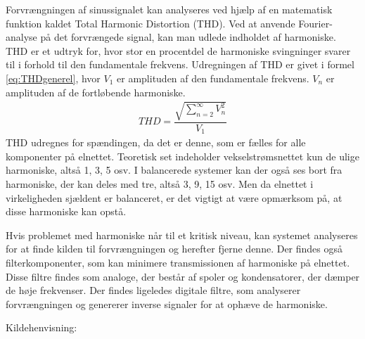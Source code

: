 Forvrængningen af sinussignalet kan analyseres ved hjælp af en matematisk funktion kaldet Total Harmonic Distortion (THD). Ved at anvende Fourier-analyse på det forvrængede signal, kan man udlede indholdet af harmoniske. THD er et udtryk for, hvor stor en procentdel de harmoniske svingninger svarer til i forhold til den fundamentale frekvens. Udregningen af THD er givet i formel \ref{eq:THDgenerel}, hvor $V_1$ er amplituden af den fundamentale frekvens. $V_n$ er amplituden af de fortløbende harmoniske. 
\begin{align}
THD = \dfrac{\sqrt{\sum_{n=2}^{\infty}V_n^{2}}}{V_{1}}
\label{eq:THDgenerel}
\end{align}
THD udregnes for spændingen, da det er denne, som er fælles for alle komponenter på elnettet. Teoretisk set indeholder vekselstrømsnettet kun de ulige harmoniske, altså 1, 3, 5 osv. I balancerede systemer kan der også ses bort fra harmoniske, der kan deles med tre, altså 3, 9, 15 osv. Men da elnettet i virkeligheden sjældent er balanceret, er det vigtigt at være opmærksom på, at disse harmoniske kan opstå. \newline

Hvis problemet med harmoniske når til et kritisk niveau, kan systemet analyseres for at finde kilden til forvrængningen og herefter fjerne denne. Der findes også filterkomponenter, som kan minimere transmissionen af harmoniske på elnettet. Disse filtre findes som analoge, der består af spoler og kondensatorer, der dæmper de høje frekvenser. Der findes ligeledes digitale filtre, som analyserer forvrængningen og genererer inverse signaler for at ophæve de harmoniske.\cite{HarmoniskeFiltre}\newline


Kildehenvisning: \cite{HarmoniskeVideo}
 

